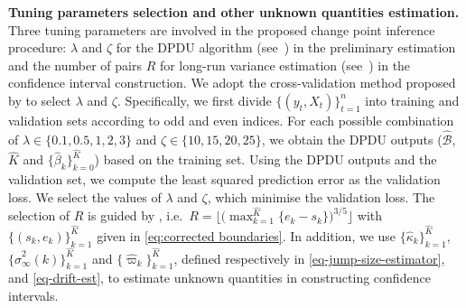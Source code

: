 \documentclass[11pt]{article}
\theoremstyle{plain}
\theoremstyle{definition}
\begin{document}
\medskip
\noindent \textbf{Tuning parameters selection and other unknown quantities estimation.}  Three tuning parameters are involved in the proposed change point inference procedure: $\lambda$ and $\zeta$ for the DPDU algorithm (see~) in the preliminary estimation and the number of pairs $R$ for long-run variance estimation (see~) in the confidence interval construction.  We adopt the cross-validation method proposed by \cite{rinaldo2021localizing} to select $\lambda$ and $\zeta$. Specifically, we first divide $\{(y_t, X_t)\}_{t =1}^{n}$ into training and validation sets according to odd and even indices. For each possible combination of $\lambda \in \{0.1, 0.5, 1, 2, 3\}$ and $\zeta \in \{10, 15, 20, 25\}$, we obtain the DPDU outputs ($\widehat{\mathcal{B}}$, $\widehat{K}$ and $\{\widehat{\beta}_k\}_{k = 0}^{\widehat{K}}$) based on the training set.  Using the DPDU outputs and the validation set, we compute the least squared prediction error as the validation loss.  We select the values of $\lambda$ and $\zeta$, which minimise the validation loss. The selection of $R$ is guided by , i.e.~$R = \Big\lfloor  \Big(\max_{k = 1}^{\widehat{K}}\{e_k - s_k\}\Big)^{3/5} \Big\rfloor$ with $\{(s_k, e_k)\}_{k = 1}^{\widehat{K}}$ given in \eqref{eq:corrected boundaries}.  In addition, we use $\{\widehat{\kappa}_k\}_{k = 1}^{\widehat{K}}$, $\{\widehat{\sigma}^2_{\infty}(k)\}_{k = 1}^{\widehat{K}}$ and $\{\widehat{\varpi}_k\}_{k = 1}^{\widehat{K}}$, defined respectively in \eqref{eq-jump-size-estimator},  and \eqref{eq-drift-est}, to estimate unknown quantities in constructing confidence intervals.
\end{document}

